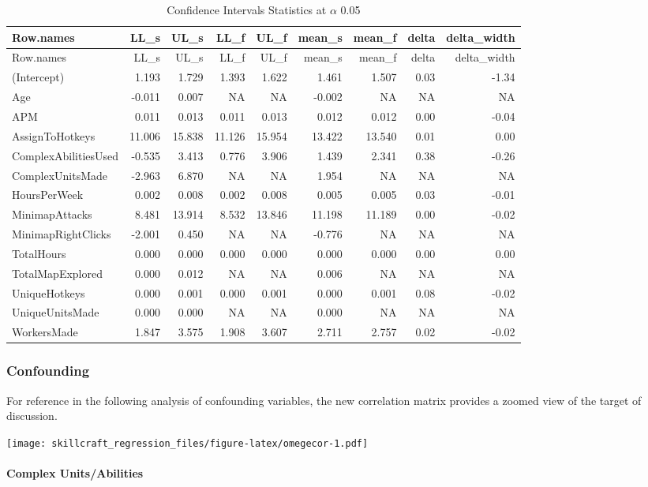 \documentclass[]{article}
\let\oldparagraph\paragraph
\renewcommand{\paragraph}[1]{\oldparagraph{#1}\mbox{}}
\begin{document}
\begin{longtable}[]{@{}lrrrrrrrr@{}}
\caption{Confidence Intervals Statistics at \(\alpha\)
0.05}\tabularnewline
\toprule
Row.names & LL\_s & UL\_s & LL\_f & UL\_f & mean\_s & mean\_f & delta &
delta\_width\tabularnewline
\midrule
\endfirsthead
\toprule
Row.names & LL\_s & UL\_s & LL\_f & UL\_f & mean\_s & mean\_f & delta &
delta\_width\tabularnewline
\midrule
\endhead
(Intercept) & 1.193 & 1.729 & 1.393 & 1.622 & 1.461 & 1.507 & 0.03 &
-1.34\tabularnewline
Age & -0.011 & 0.007 & NA & NA & -0.002 & NA & NA & NA\tabularnewline
APM & 0.011 & 0.013 & 0.011 & 0.013 & 0.012 & 0.012 & 0.00 &
-0.04\tabularnewline
AssignToHotkeys & 11.006 & 15.838 & 11.126 & 15.954 & 13.422 & 13.540 &
0.01 & 0.00\tabularnewline
ComplexAbilitiesUsed & -0.535 & 3.413 & 0.776 & 3.906 & 1.439 & 2.341 &
0.38 & -0.26\tabularnewline
ComplexUnitsMade & -2.963 & 6.870 & NA & NA & 1.954 & NA & NA &
NA\tabularnewline
HoursPerWeek & 0.002 & 0.008 & 0.002 & 0.008 & 0.005 & 0.005 & 0.03 &
-0.01\tabularnewline
MinimapAttacks & 8.481 & 13.914 & 8.532 & 13.846 & 11.198 & 11.189 &
0.00 & -0.02\tabularnewline
MinimapRightClicks & -2.001 & 0.450 & NA & NA & -0.776 & NA & NA &
NA\tabularnewline
TotalHours & 0.000 & 0.000 & 0.000 & 0.000 & 0.000 & 0.000 & 0.00 &
0.00\tabularnewline
TotalMapExplored & 0.000 & 0.012 & NA & NA & 0.006 & NA & NA &
NA\tabularnewline
UniqueHotkeys & 0.000 & 0.001 & 0.000 & 0.001 & 0.000 & 0.001 & 0.08 &
-0.02\tabularnewline
UniqueUnitsMade & 0.000 & 0.000 & NA & NA & 0.000 & NA & NA &
NA\tabularnewline
WorkersMade & 1.847 & 3.575 & 1.908 & 3.607 & 2.711 & 2.757 & 0.02 &
-0.02\tabularnewline
\bottomrule
\end{longtable}

\hypertarget{confounding}{%
\subsubsection{Confounding}\label{confounding}}

For reference in the following analysis of confounding variables, the
new correlation matrix provides a zoomed view of the target of
discussion.

\texttt{[image: skillcraft\_regression\_files/figure-latex/omegecor-1.pdf]}

\hypertarget{complex-unitsabilities}{%
\paragraph{Complex Units/Abilities}\label{complex-unitsabilities}}
\end{document}
